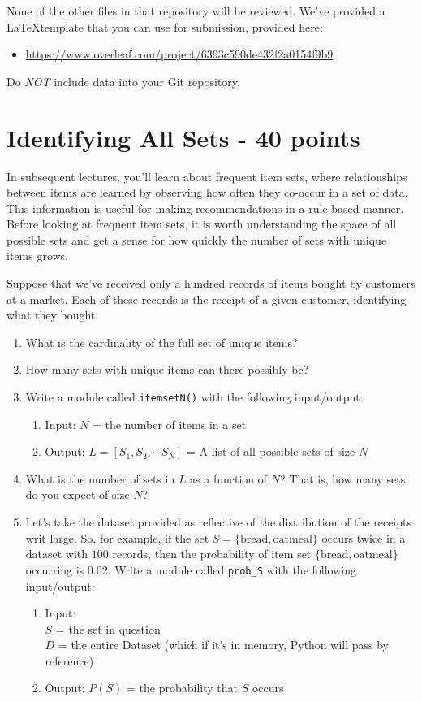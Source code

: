 \documentclass[paper=a4, fontsize=11pt]{scrartcl} %
\numberwithin{equation}{section} %
\numberwithin{figure}{section} %
\numberwithin{table}{section} %
\begin{document}
None of the other files in that repository will be reviewed. We've provided a \LaTeX template that you can use for submission, provided here:
\begin{itemize}
    \item \url{https://www.overleaf.com/project/6393c590de432f2a0154f9b9}
\end{itemize}

Do \emph{NOT} include data into your Git repository.

\section{Identifying All Sets - 40 points}

In subsequent lectures, you'll learn about frequent item sets, where relationships between items are learned by observing how often they co-occur in a set of data. This information is useful for making recommendations in a rule based manner. Before looking at frequent item sets, it is worth understanding the space of all possible sets and get a sense for how quickly the number of sets with unique items grows.

Suppose that we've received only a hundred records of items bought by customers at a market. Each of these records is the receipt of a given customer, identifying what they bought.

\begin{enumerate}
    \item What is the cardinality of the full set of unique items?
    \item How many sets with unique items can there possibly be?
    \item Write a module called \verb"itemsetN()" with the following input/output:
      \begin{enumerate}
      \item Input: $N$ = the number of items in a set
      \item Output: $L = [ S_1, S_2, \cdots S_N ]$ = A list of all possible sets of size $N$
      \end{enumerate}
    \item What is the number of sets in $L$ as a function of $N$? That is, how many sets do you expect of size $N$?
    \item Let's take the dataset provided as reflective of the distribution of the receipts writ large. So, for example, if the set $S= \{ \text{bread}, \text{oatmeal}\}$ occurs twice in a dataset with $100$ records, then the probability of item set $\{ \text{bread}, \text{oatmeal} \}$ occurring is 0.02. Write a module called \verb"prob_S" with the following input/output:
      \begin{enumerate}
      \item Input: \\ $S$ = the set in question \\ $D$ = the entire Dataset (which if it's in memory, Python will pass by reference)
      \item Output: $P(S)$ = the probability that $S$ occurs
      \end{enumerate}
\end{enumerate}
\end{document}
